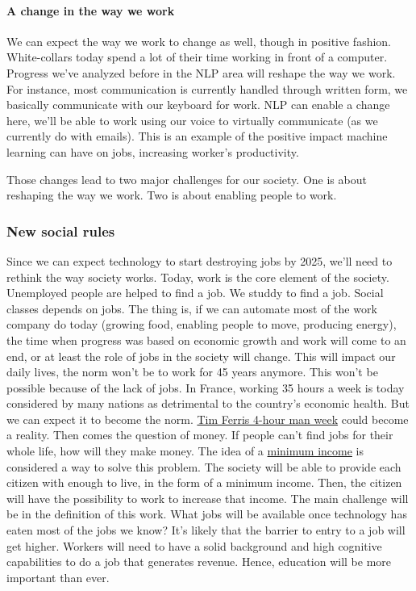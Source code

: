 \documentclass[12pt]{article}
\begin{document}
\paragraph{A change in the way we work}

We can expect the way we work to change as well, though in positive fashion. White-collars today spend a lot of their time working in front of a computer. Progress we've analyzed before in the NLP area will reshape the way we work. For instance, most communication is currently handled through written form, we basically communicate with our keyboard for work. NLP can enable a change here, we'll be able to work using our voice to virtually communicate (as we currently do with emails). This is an example of the positive impact machine learning can have on jobs, increasing worker's productivity.

Those changes lead to two major challenges for our society. One is about reshaping the way we work. Two is about enabling people to work.

\subsubsection{New social rules}

Since we can expect technology to start destroying jobs by 2025, we'll need to rethink the way society works. Today, work is the core element of the society. Unemployed people are helped to find a job. We studdy to find a job. Social classes depends on jobs.
The thing is, if we can automate most of the work company do today (growing food, enabling people to move, producing energy), the time when progress was based on economic growth and work will come to an end, or at least the role of jobs in the society will change.
This will impact our daily lives, the norm won't be to work for 45 years anymore. This won't be possible because of the lack of jobs. In France, working 35 hours a week is today considered by many nations as detrimental to the country's economic health. But we can expect it to become the norm. \href{http://fourhourworkweek.com/}{Tim Ferris 4-hour man week} could become a reality.
Then comes the question of money. If people can't find jobs for their whole life, how will they make money. The idea of a \href{http://www.globalresearch.ca/an-unconditional-citizens-income-a-basic-guaranteed-minimum-income/5423130}{minimum income} is considered a way to solve this problem. The society will be able to provide each citizen with enough to live, in the form of a minimum income. Then, the citizen will have the possibility to work to increase that income.
The main challenge will be in the definition of this work. What jobs will be available once technology has eaten most of the jobs we know? It's likely that the barrier to entry to a job will get higher. Workers will need to have a solid background and high cognitive capabilities to do a job that generates revenue. Hence, education will be more important than ever.
\end{document}
